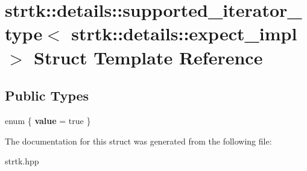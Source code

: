 \hypertarget{structstrtk_1_1details_1_1supported__iterator__type_3_01strtk_1_1details_1_1expect__impl_01_4}{\section{strtk\-:\-:details\-:\-:supported\-\_\-iterator\-\_\-type$<$ strtk\-:\-:details\-:\-:expect\-\_\-impl $>$ Struct Template Reference}
\label{structstrtk_1_1details_1_1supported__iterator__type_3_01strtk_1_1details_1_1expect__impl_01_4}
}
\subsection*{Public Types}
\begin{DoxyCompactItemize}
\item 
enum \{ {\bfseries value} = true
 \}
\end{DoxyCompactItemize}


The documentation for this struct was generated from the following file\-:\begin{DoxyCompactItemize}
\item 
strtk.\-hpp\end{DoxyCompactItemize}
